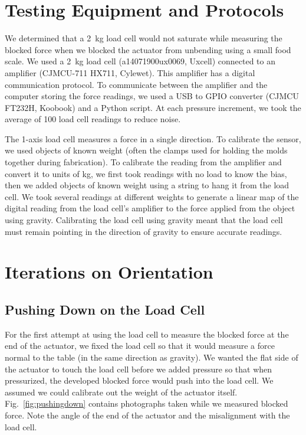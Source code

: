 \clearpage
\section{Testing Equipment and Protocols}

We determined that a 2~kg load cell would not saturate while measuring the blocked force when we blocked the actuator from unbending using a small food scale. We used a 2~kg load cell (a14071900ux0069, Uxcell) connected to an amplifier (CJMCU-711 HX711, Cylewet). This amplifier has a digital communication protocol. To communicate between the amplifier and the computer storing the force readings, we used a USB to GPIO converter (CJMCU FT232H, Koobook) and a Python script. At each pressure increment, we took the average of 100 load cell readings to reduce noise. 

The 1-axis load cell measures a force in a single direction. To calibrate the sensor, we used objects of known weight (often the clamps used for holding the molds together during fabrication). To calibrate the reading from the amplifier and convert it to units of kg, we first took readings with no load to know the bias, then we added objects of known weight using a string to hang it from the load cell. We took several readings at different weights to generate a linear map of the digital reading from the load cell's amplifier to the force applied from the object using gravity. Calibrating the load cell using gravity meant that the load cell must remain pointing in the direction of gravity to ensure accurate readings. 

\section{Iterations on Orientation}

\subsection{Pushing Down on the Load Cell}

For the first attempt at using the load cell to measure the blocked force at the end of the actuator, we fixed the load cell so that it would measure a force normal to the table (in the same direction as gravity). We wanted the flat side of the actuator to touch the load cell before we added pressure so that when pressurized, the developed blocked force would push into the load cell. We assumed we could calibrate out the weight of the actuator itself. Fig.~\ref{fig:pushingdown} contains photographs taken while we measured blocked force. Note the angle of the end of the actuator and the misalignment with the load cell. \\

